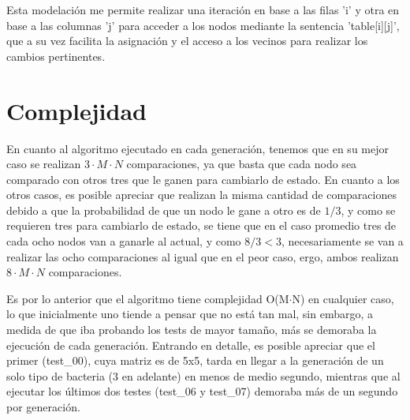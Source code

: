 \documentclass[12pt]{article}
\begin{document}
\hspace{5mm}
Esta modelación me permite realizar una iteración en base a las filas 'i' y otra en base a las columnas 'j' 
para acceder a los nodos mediante la sentencia 'table[i][j]', que a su vez facilita la asignación y el acceso 
a los vecinos para realizar los cambios pertinentes.

\section*{Complejidad}

\hspace{5mm}
En cuanto al algoritmo ejecutado en cada generación, tenemos que en su mejor caso se realizan $3 \cdot M 
\cdot N$ comparaciones, ya que basta que cada nodo sea comparado con otros tres que le ganen para cambiarlo 
de estado. En cuanto a los otros casos, es posible apreciar que realizan la misma cantidad de comparaciones 
debido a que la probabilidad de que un nodo le gane a otro es de $1 / 3$, y como se requieren tres para 
cambiarlo de estado, se tiene que en el caso promedio tres de cada ocho nodos van a ganarle al actual, y 
como $8 / 3 < 3$, necesariamente se van a realizar las ocho comparaciones al igual que en el peor caso, ergo, 
ambos realizan $8 \cdot M \cdot N$ comparaciones.

\hspace{5mm}
Es por lo anterior que el algoritmo tiene complejidad O(M$\cdot$N) en cualquier caso, lo que inicialmente uno 
tiende a pensar que no está tan mal, sin embargo, a medida de que iba probando los tests de mayor tamaño, más 
se demoraba la ejecución de cada generación. Entrando en detalle, es posible apreciar que el primer (test\_00), 
cuya matriz es de 5x5, tarda en llegar a la generación de un solo tipo de bacteria (3 en adelante) en menos de 
medio segundo, mientras que al ejecutar los últimos dos testes (test\_06 y test\_07) demoraba más de un segundo 
por generación. \\
\end{document}
